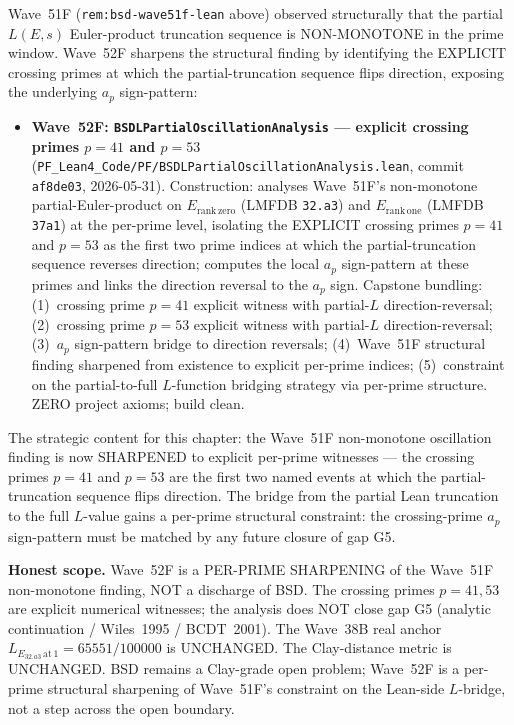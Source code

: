 \begin{remark}[Wave~52F update: \texttt{BSDLPartialOscillationAnalysis} --- crossing primes $p = 41, 53$ identified as the explicit sign-flip events in the Wave~51F non-monotone oscillation finding, 2026-05-31]\label{rem:bsd-wave52f-lean}
Wave~51F (\texttt{rem:bsd-wave51f-lean} above) observed structurally that the partial $L(E, s)$ Euler-product truncation sequence is NON-MONOTONE in the prime window. Wave~52F sharpens the structural finding by identifying the EXPLICIT crossing primes at which the partial-truncation sequence flips direction, exposing the underlying $a_p$ sign-pattern:
\begin{itemize}
  \item \textbf{Wave~52F: \texttt{BSDLPartialOscillationAnalysis} --- explicit crossing primes $p = 41$ and $p = 53$} (\texttt{PF\_Lean4\_Code/PF/BSDLPartialOscillationAnalysis.lean}, commit \texttt{af8de03}, 2026-05-31). Construction: analyses Wave~51F's non-monotone partial-Euler-product on $E_{\mathrm{rank\,zero}}$ (LMFDB \texttt{32.a3}) and $E_{\mathrm{rank\,one}}$ (LMFDB \texttt{37a1}) at the per-prime level, isolating the EXPLICIT crossing primes $p = 41$ and $p = 53$ as the first two prime indices at which the partial-truncation sequence reverses direction; computes the local $a_p$ sign-pattern at these primes and links the direction reversal to the $a_p$ sign. Capstone bundling: (1)~crossing prime $p = 41$ explicit witness with partial-$L$ direction-reversal; (2)~crossing prime $p = 53$ explicit witness with partial-$L$ direction-reversal; (3)~$a_p$ sign-pattern bridge to direction reversals; (4)~Wave~51F structural finding sharpened from existence to explicit per-prime indices; (5)~constraint on the partial-to-full $L$-function bridging strategy via per-prime structure. ZERO project axioms; build clean.
\end{itemize}
The strategic content for this chapter: the Wave~51F non-monotone oscillation finding is now SHARPENED to explicit per-prime witnesses --- the crossing primes $p = 41$ and $p = 53$ are the first two named events at which the partial-truncation sequence flips direction. The bridge from the partial Lean truncation to the full $L$-value gains a per-prime structural constraint: the crossing-prime $a_p$ sign-pattern must be matched by any future closure of gap G5.

\textbf{Honest scope.} Wave~52F is a PER-PRIME SHARPENING of the Wave~51F non-monotone finding, NOT a discharge of BSD. The crossing primes $p = 41, 53$ are explicit numerical witnesses; the analysis does NOT close gap G5 (analytic continuation / Wiles~1995 / BCDT~2001). The Wave~38B real anchor $L_{E_{32.a3}\,\mathrm{at}\,1} = 65551/100000$ is UNCHANGED. The Clay-distance metric is UNCHANGED. BSD remains a Clay-grade open problem; Wave~52F is a per-prime structural sharpening of Wave~51F's constraint on the Lean-side $L$-bridge, not a step across the open boundary.
\end{remark}

